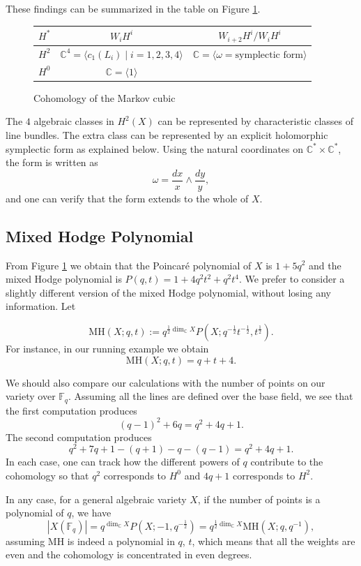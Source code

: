 \documentclass[12pt]{amsart}
\theoremstyle{definition}
\theoremstyle{remark}
\numberwithin{equation}{section}
\newcommand{\BC}{\mathbb C}
\newcommand{\BF}{\mathbb F}
\begin{document}
	These findings can be summarized in the table on Figure \ref{fig:cohomology}.
	
	\begin{figure}
		\begin{tabular}{c|c|c}
			$H^*$ & $W_i H^i$ & $W_{i+2} H^i / W_{i} H^i$ \\
			\hline
			$H^2$ & $\mathbb{C}^4 = \langle c_1(L_i)\;|\;i=1,2,3,4\rangle$ & $\mathbb{C} = \langle \omega=\text{symplectic form} \rangle$ \\
			$H^0$ & $\mathbb{C} = \langle 1 \rangle$ &
		\end{tabular}
		\caption{\label{fig:cohomology}Cohomology of the Markov cubic}
	\end{figure}
	
	The $4$ algebraic classes in $H^2(X)$ can be represented by characteristic classes of line bundles. The extra class can be represented by an explicit holomorphic symplectic form as explained below. Using the natural coordinates on $\BC^*\times \BC^*$, the form is written as
	\[
	\omega = \frac{dx}x \wedge \frac{dy} y,
	\]	
	and one can verify that the form extends to the whole of $X$.
	
	\subsection{Mixed Hodge Polynomial}\label{ssec:mixed hodge polynomial}
	From Figure \ref{fig:cohomology} we obtain that the Poincar\'e polynomial of $X$ is $1 + 5 q^2$ and the mixed Hodge polynomial is $P(q,t) = 1 + 4 q^2 t^2 + q^2 t^4$. We prefer to consider a slightly different version of the mixed Hodge polynomial, without losing any information. Let
	
	\[
	\mathrm{MH}(X; q,t) := q^{\frac12 \dim_\BC X} P(X;q^{-\frac12} t^{-\frac12}, t^{\frac12}).
	\]
	For instance, in our running example we obtain
	\[
	\mathrm{MH}(X; q,t) = q + t + 4.
	\]
	
	We should also compare our calculations with the number of points on our variety over $\BF_q$. Assuming all the lines are defined over the base field, we see that the first computation produces
	\[
	(q-1)^2 + 6 q  = q^2 + 4 q + 1.
	\]
	The second computation produces
	\[
	q^2 + 7q + 1 - (q+1) - q - (q-1) = q^2 + 4 q + 1.
	\]
	In each case, one can track how the different powers of $q$ contribute to the cohomology so that $q^2$ corresponds to $H^0$ and $4q + 1 $ corresponds to $H^2$.
	
	In any case, for a general algebraic variety $X$, if the number of points is a polynomial of $q$, we have
	\begin{equation}\label{eq:Fq points and mixed Hodge}
		|X(\mathbb{F}_q)| = q^{\dim_\BC X} P(X;-1,q^{-\frac12}) = q^{\frac12 \dim_\BC X} \mathrm{MH}(X;q,q^{-1}),
	\end{equation}
	assuming $\mathrm{MH}$ is indeed a polynomial in $q$, $t$, which means that all the weights are even and the cohomology is concentrated in even degrees.
	
\end{document}
